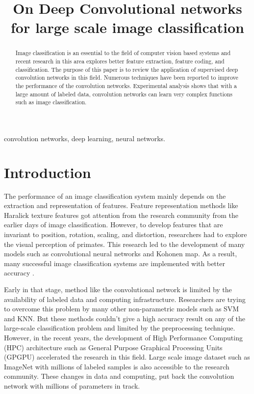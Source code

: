\documentclass{article}
\title { On Deep Convolutional networks for large scale image classification}
\begin{document}
\topmargin=0mm 
%
\maketitle
%
\begin{abstract}
Image classification is an essential to the field of computer vision  based systems and recent research in this area explores better feature extraction, feature coding, and classification.  The purpose of this paper is to review the application of supervised  deep convolution networks in this field. Numerous techniques have been reported to improve the performance of the convolution networks. Experimental analysis shows that with a large amount of labeled data, convolution networks can learn very complex functions such as image classification. 



\end{abstract}
%
\begin{keywords}
convolution networks, deep learning, neural networks.
\end{keywords}
%
\section{Introduction}
\label{sec:intro}
The performance of an  image  classification system mainly depends on the  extraction and  representation of features.  Feature representation methods like Haralick texture features \cite{Haralick1973} got attention from the research community from the earlier days of  image classification. However, to develop features that are invariant to position, rotation, scaling, and distortion, researchers had  to  explore the visual perception of primates. This research  led to  the development of many models such as convolutional neural networks\cite{LeCun1998} and  Kohonen map\cite{kohonen1982self}. 
As a result, many successful image classification systems are  implemented with better accuracy \cite{lecun-89e}.

Early in that stage, method like the convolutional network is limited by the  availability of labeled  data and computing infrastructure. Researchers are trying to overcome  this problem by many other non-parametric models such as SVM and KNN. But these methods couldn't give a high accuracy result  on any of the large-scale classification problem  and limited by the preprocessing technique.  However, in the recent years, the development of  High Performance Computing (HPC) architecture such as General Purpose Graphical Processing Units (GPGPU)  accelerated the research in this field. Large scale image  dataset such as ImageNet \cite{imagenet}  with  millions of labeled samples is also accessible to the research community. These changes in data and computing, put back the convolution network with millions of parameters in track. 
\end{document}
